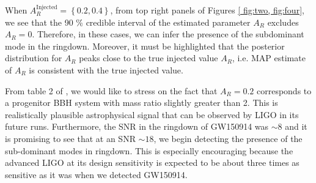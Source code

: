 When $A_{R}^{\mathrm{Injected}} = \left\lbrace 0.2, 0.4 \right\rbrace $, from top right panels of Figures \ref{ fig:two, fig:four}, we see that the 90 \% credible interval of the estimated parameter $A_{R}$ excludes $A_{R} =0 $. Therefore, in these cases, we can infer the presence of the subdominant mode in the ringdown. Moreover, it must be highlighted that the posterior distribution for $A_{R}$ peaks close to the true injected value $A_{R} $, i.e. MAP estimate of $A_{R}$ is consistent with the true injected value.   

From table 2 of \cite{bertiparam}, we would like to stress on the fact that $A_{R} =0.2 $ corresponds to a progenitor BBH system with mass ratio slightly greater than 2. This is realistically plausible astrophysical signal that can be observed by LIGO in its future runs. Furthermore, the SNR in the ringdown of GW150914 was $\sim 8$ and it is promising to see that at an SNR $\sim 18$, we begin detecting the presence of the sub-dominant modes in ringdown. This is especially encouraging because the advanced LIGO at its design sensitivity is expected to be about three times as sensitive as it was when we detected GW150914. 

  


